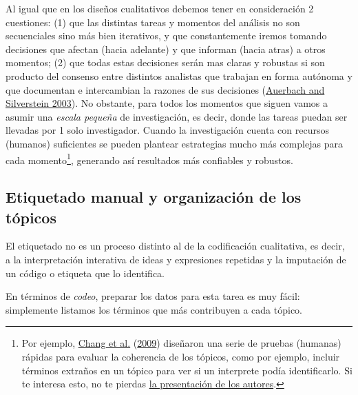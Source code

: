 \documentclass[
]{book}
\begin{document}
Al igual que en los diseños cualitativos debemos tener en consideración 2 cuestiones: (1) que las distintas tareas y momentos del análisis no son secuenciales sino más bien iterativos, y que constantemente iremos tomando decisiones que afectan (hacia adelante) y que informan (hacia atras) a otros momentos; (2) que todas estas decisiones serán mas claras y robustas si son producto del consenso entre distintos analistas que trabajan en forma autónoma y que documentan e intercambian la razones de sus decisiones (\protect\hyperlink{ref-Auerbach2003}{Auerbach and Silverstein 2003}).
No obstante, para todos los momentos que siguen vamos a asumir una \emph{escala pequeña} de investigación, es decir, donde las tareas puedan ser llevadas por 1 solo investigador. Cuando la investigación cuenta con recursos (humanos) suficientes se pueden plantear estrategias mucho más complejas para cada momento\footnote{Por ejemplo, \protect\hyperlink{ref-Chang2009}{Chang et al.} (\protect\hyperlink{ref-Chang2009}{2009}) diseñaron una serie de pruebas (humanas) rápidas para evaluar la coherencia de los tópicos, como por ejemplo, incluir términos extraños en un tópico para ver si un interprete podía identificarlo. Si te interesa esto, no te pierdas \href{https://www.youtube.com/watch?v=ZQLiDh1NJK4\&list=UUIXpjlxPL5Ow8rPO_gOHISQ\&index=83}{la presentación de los autores}.}, generando así resultados más confiables y robustos.

\hypertarget{etiquetado-manual-y-organizaciuxf3n-de-los-tuxf3picos}{%
\subsection{Etiquetado manual y organización de los tópicos}\label{etiquetado-manual-y-organizaciuxf3n-de-los-tuxf3picos}}

El etiquetado no es un proceso distinto al de la codificación cualitativa, es decir, a la interpretación interativa de ideas y expresiones repetidas y la imputación de un código o etiqueta que lo identifica.

En términos de \emph{codeo}, preparar los datos para esta tarea es muy fácil: simplemente listamos los términos que más contribuyen a cada tópico.
\end{document}
